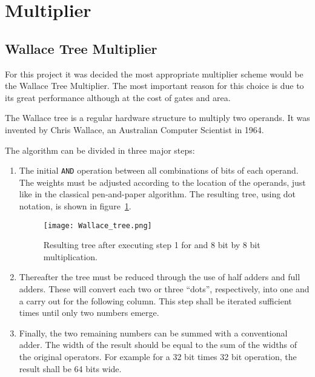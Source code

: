 \newcommand{\AND}{\texttt{AND}\xspace}
\newcommand{\RST}{\texttt{RST}\xspace}
\newcommand{\CLK}{\texttt{CLK}\xspace}
\newcommand{\HOLDN}{\texttt{HOLDN}\xspace}
\newcommand{\MULI}{\texttt{MULI}\xspace}
\newcommand{\MULO}{\texttt{MULO}\xspace}
\newcommand{\infer}{\texttt{infer}\xspace}
\newcommand{\multype}{\texttt{multype}\xspace}
\newcommand{\pipe}{\texttt{pipe}\xspace}
\newcommand{\mac}{\texttt{mac}\xspace}
\newcommand{\STDV}{\texttt{STD\_LOGIC\_VECTOR}\xspace}

\section{Multiplier}


\subsection{Wallace Tree Multiplier}
\label{sec:wallace}

For this project it was decided the most appropriate multiplier scheme would be the Wallace Tree Multiplier. The most important reason for this choice is due to its great performance although at the cost of gates and area.

The Wallace tree is a regular hardware structure to multiply two operands.
It was invented by Chris Wallace, an Australian Computer Scientist in 1964.

The algorithm can be divided in three major steps:
\begin{enumerate}
\item The initial \AND operation between all combinations of bits of each operand. The weights must be adjusted according to the location of the operands, just like in the classical pen-and-paper algorithm. The resulting tree, using dot notation, is shown in figure~\ref{fig:wallace_tree}.

\begin{figure}[H]
\centering
\texttt{[image: Wallace\_tree.png]}
\caption{Resulting tree after executing step 1 for and 8 bit by 8 bit multiplication.}
\label{fig:wallace_tree}
\end{figure}

\item Thereafter the tree must be reduced through the use of half adders and full adders. These will convert each two or three ``dots'', respectively, into one and a carry out for the following column. This step shall be iterated sufficient times until only two numbers emerge.

\item Finally, the two remaining numbers can be summed with a conventional adder. The width of the result should be equal to the sum of the widths of the original operators. For example for a 32 bit times 32 bit operation, the result shall be 64 bits wide. 
\end{enumerate}  


